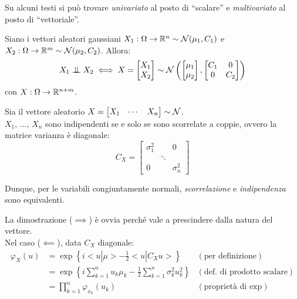 \begin{nb}
  Su alcuni testi si può trovare \textit{univariato} al posto di ``scalare'' e \textit{multivariato} al posto di ``vettoriale''.
\end{nb}
\medskip
\begin{propb}[\JPTh{16.3}]
  Siano i vettori aleatori gaussiani $X_1: \Omega \to \mathbb R^n \sim\mathcal N(\mu_1, C_1)$ e $ X_2: \Omega \to \mathbb R^m \sim \mathcal N(\mu_2, C_2)$. Allora:
  $$X_1 \indep X_2 \iff X= \begin{bmatrix}  X_1 \\ X_2  \end{bmatrix} \sim \Nc \left(\begin{bmatrix}  \mu_1 \\ \mu_2 \end{bmatrix}, \begin{bmatrix}  C_1 & 0 \\ 0 & C_2   \end{bmatrix} \right)$$
  con $X: \Omega \to \mathbb R^{n+m}$.
\end{propb}

\bigskip
\begin{teob}[\JPTh{16.4}]
  Sia il vettore aleatorio $X=\begin{bmatrix}  X_1 & \cdots & X_n  \end{bmatrix} \sim \mathcal N$. \\
  $X_1, \, \dots, \,  X_n$ sono indipendenti se e solo se sono scorrelate a coppie, ovvero la matrice varianza è diagonale:
  $$C_X= \begin{bmatrix} \sigma_1^2 &  & 0 \\   & \ddots &  \\ 0 &   & \sigma_n^2\end{bmatrix}$$
\end{teob}

Dunque, per le variabili congiuntamente normali, \textit{scorrelazione} e \textit{indipendenza} sono equivalenti.

\smallskip
\begin{dimo}\belowdisplayskip=-21pt
  La dimostrazione ($\implies$) è ovvia perché vale a prescindere dalla natura del vettore.\\
  Nel caso ($\impliedby$), data $C_X$ diagonale:
  \begin{align*}
  \varphi_X(u) &= \exp \left \{ i<u|\mu> - \frac{1}{2} <u|C_X u> \right \} & (\text{per definizione}) \\
  &= \exp \left \{ i \sum_{k=1}^{n} u_k \mu_k - \frac{1}{2} \sum_{k=1}^{n} \sigma_k^2 u_k^2 \right \} & (\text{def. di prodotto scalare}) \\
  &= \prod_{k=1}^{n} \varphi_{x_k}(u_k) & (\text{proprietà di exp})
  \end{align*}\qedhere
\end{dimo}

